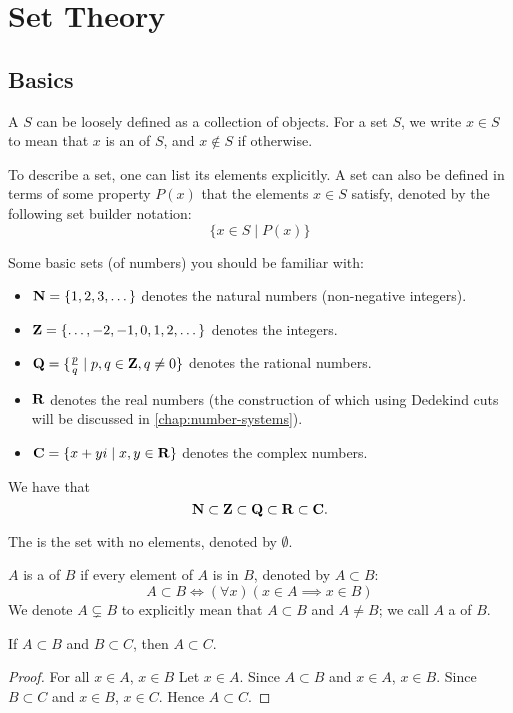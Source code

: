\chapter{Set Theory}\label{chap:set-theory}
\section{Basics}
A  $S$ can be loosely defined as a collection of objects. For a set $S$, we write $x \in S$ to mean that $x$ is an  of $S$, and $x \notin S$ if otherwise. 

To describe a set, one can list its elements explicitly. A set can also be defined in terms of some property $P(x)$ that the elements $x \in S$ satisfy, denoted by the following set builder notation:
\[\{x\in S \mid P(x)\}\]

Some basic sets (of numbers) you should be familiar with:
\begin{itemize}
\item $\mathbf N=\{1,2,3,\dots\}$ denotes the natural numbers (non-negative integers).
\item $\mathbf Z=\{\dots,-2,-1,0,1,2,\dots\}$ denotes the integers.
\item $\mathbf Q=\{\frac{p}{q} \mid p,q\in\mathbf Z, q\neq0\}$ denotes the rational numbers.
\item $\mathbf R$ denotes the real numbers (the construction of which using Dedekind cuts will be discussed in \cref{chap:number-systems}).
\item $\mathbf C=\{x+yi \mid x,y\in\mathbf R\}$ denotes the complex numbers.
\end{itemize}

We have that
\[\mathbf N\subset\mathbf Z\subset\mathbf Q\subset\mathbf R\subset\mathbf C.\]

The  is the set with no elements, denoted by $\emptyset$.

$A$ is a  of $B$ if every element of $A$ is in $B$, denoted by $A\subset B$:
\[A\subset B\iff(\forall x)(x\in A \implies x\in B)\]
We denote $A\subsetneq B$ to explicitly mean that $A\subset B$ and $A\neq B$; we call $A$ a  of $B$.

\begin{proposition}
If $A \subset B$ and $B \subset C$, then $A \subset C$.
\end{proposition}

\begin{proof}
For all $x\in A$, $x\in B$
Let $x\in A$. 
Since $A \subset B$ and $x\in A$, $x\in B$. 
Since $B \subset C$ and $x\in B$, $x\in C$. 
Hence $A \subset C$.
\end{proof}


